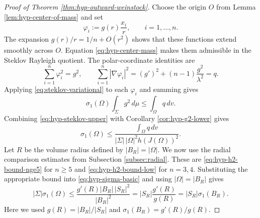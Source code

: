 \documentclass[11pt,reqno]{amsart}
\numberwithin{equation}{section}
\theoremstyle{definition}
\begin{document}
\begin{proof}[Proof of Theorem \ref{thm:hyp-outward-weinstock}]
Choose the origin $O$ from Lemma \ref{lem:hyp-center-of-mass} and set
\begin{equation*}
    \varphi_i:=g(r)\frac{x_i}{r},
    \qquad i=1,\ldots,n.
\end{equation*}
The expansion $g(r)/r=1/n+O(r^2)$ shows that these functions extend smoothly across $O$.  Equation \eqref{eq:hyp-center-mass} makes them admissible in the Steklov Rayleigh quotient.  The polar-coordinate identities are
\begin{equation*}
    \sum_{i=1}^n\varphi_i^2=g^2,
    \qquad
    \sum_{i=1}^n|\nabla\varphi_i|^2
    =(g')^2+(n-1)\frac{g^2}{\lambda^2}=q.
\end{equation*}
Applying \eqref{eq:steklov-variational} to each $\varphi_i$ and summing gives
\begin{equation}\label{eq:hyp-steklov-upper}
    \sigma_1(\Omega)\int_\Sigma g^2\,d\mu
    \leq\int_\Omega q\,dv.
\end{equation}
Combining \eqref{eq:hyp-steklov-upper} with Corollary \ref{cor:hyp-g2-lower} gives
\begin{equation}\label{eq:hyp-sigma-basic}
    \sigma_1(\Omega)
    \leq
    \frac{\int_\Omega q\,dv}{|\Sigma|\,|\Omega|^2h(J(\Omega))^2}.
\end{equation}
Let $R$ be the volume radius defined by $|B_R|=|\Omega|$. We now use the radial comparison estimates from Subsection \ref{subsec:radial}.  These are \eqref{eq:hyp-h2-bound-nge5} for $n\geq5$ and \eqref{eq:hyp-h2-bound-low} for $n=3,4$.  Substituting the appropriate bound into \eqref{eq:hyp-sigma-basic} and using $|\Omega|=|B_R|$ gives
\begin{equation}\label{eq:hyp-area-sigma-all}
    |\Sigma|\sigma_1(\Omega)
    \leq
    \frac{g'(R)|B_R|\,|S_R|^2}{|B_R|^2}
    =|S_R|\frac{g'(R)}{g(R)}
    =|S_R|\sigma_1(B_R).
\end{equation}
Here we used $g(R)=|B_R|/|S_R|$ and $\sigma_1(B_R)=g'(R)/g(R)$.


\end{proof}
\end{document}
